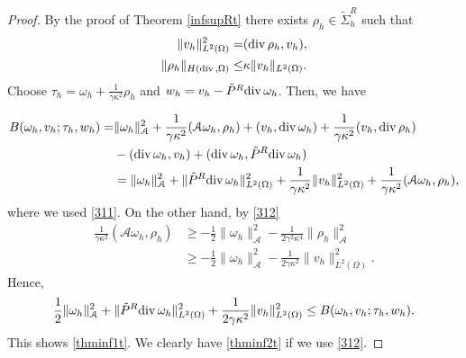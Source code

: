 \documentclass[12pt]{amsart}
\numberwithin{equation}{section}
\theoremstyle{definition}
\theoremstyle{remark}
\renewcommand{\(}{\bigl(}
\renewcommand{\)}{\bigr)}
\newcommand{\dive}{{\ensuremath\mathop{\mathrm{div}\,}}} %
\newcommand{\Aa}{\mathcal{A}}
\begin{document}
\begin{proof}
By the proof of Theorem \ref{infsupRt} there exists $\rho_h \in \tilde{\Sigma}^R_h$ such that
\begin{alignat}{1}
\|v_h\|_{L^2(\Omega)}^2 = & (\dive \rho_h, v_h), \label{311}\\
\|\rho_h\|_{H(\dive,\Omega)} \le & \kappa \| v_h\|_{L^2(\Omega)}. \label{312}
\end{alignat}
Choose $\tau_h=\omega_h+ \frac{1}{\gamma \kappa^2} \rho_h$ and $w_h= v_h-\tilde{P}^R \dive \omega_h$. Then, we have 

\begin{alignat*}{1}
  B(\omega_h, v_h; \tau_h, w_h)=
  &  \|\omega_h\|_{\Aa}^2+\frac{1}{\gamma \kappa^2} (\Aa \omega_h,\rho_h) + (v_h, \dive \omega_h)+ \frac{1}{ \gamma \kappa^2} (v_h, \dive \rho_h) \\
&-(\dive \omega_h, v_h)+ (\dive \omega_h, \tilde{P}^R \dive \omega_h )    \\
& =   \| \omega_h\|_{\Aa}^2+ \|  \tilde{P}^R \dive\omega_h\|_{L^2(\Omega)}^2+ \frac{1}{ \gamma \kappa^2} \|v_h\|_{L^2(\Omega)}^2+\frac{1}{ \gamma \kappa^2} (\Aa \omega_h,\rho_h),
\end{alignat*}
where we used \eqref{311}.
On the other hand, by \eqref{312}
\begin{align*}
    \frac{1}{\gamma \kappa^2} (\Aa \omega_h,\rho_h) &\ge  -\frac{1}{2} \|\omega_h\|_{\Aa}^2- \frac{1}{2 \gamma^2 \kappa^4} \| \rho_h\|_{\Aa}^2 
    \\
    &\ge  -\frac{1}{2} \|  \omega_h\|_{\Aa}^2- \frac{1}{2 \gamma \kappa^2} \| v_h\|_{L^2(\Omega)}^2.
\end{align*}
Hence, 
\begin{alignat*}{1}
\frac{1}{2}\| \omega_h\|_{\Aa}^2+ \|\tilde{P}^R \dive \omega_h\|_{L^2(\Omega)}^2+\frac{1}{2 \gamma \kappa^2}\|v_h\|_{L^2(\Omega)}^2 \le  B(\omega_h, v_h; \tau_h, w_h).
\end{alignat*}
This shows \eqref{thminf1t}. We clearly have \eqref{thminf2t} if we use \eqref{312}.
\end{proof}
\end{document}
